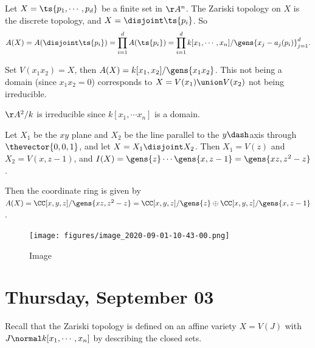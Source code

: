 \begin{example}

Let \(X = \ts{p_1, \cdots, p_d}\) be a finite set in \(\AA^n\). The
Zariski topology on \(X\) is the discrete topology, and
\(X = \disjoint \ts{p_i}\). So
\begin{align*}  
A(X) = A(\disjoint \ts{p_i}) = \prod_{i=1}^d A({\ts{p_i}}) = \prod_{i=1}^d k[x_1, \cdots, x_n] / \gens{x_j - a_j(p_i)}_{j=1}^d
.\end{align*}

\end{example}

\begin{example}

Set \(V(x_1 x_2) = X\), then \(A(X) = k[x_1, x_2]/ \gens{x_1 x_2}\).
This not being a domain (since \(x_1 x_2 = 0\)) corresponds to
\(X = V(x_1) \union V(x_2)\) not being irreducible.

\end{example}

\begin{example}

\(\AA^2/k\) is irreducible since \(k[x_1, \cdots x_n]\) is a domain.

\end{example}

\begin{example}

Let \(X_1\) be the \(xy\) plane and \(X_2\) be the line parallel to the
\(y\dash\)axis through \(\thevector{0,0,1}\), and let
\(X= X_1 \disjoint X_2\). Then \(X_1 = V(z)\) and \(X_2 = V(x, z-1)\),
and \(I(X) = \gens{z} \cdots \gens{x, z-1}= \gens{xz, z^2 - z}\).

Then the coordinate ring is given by
\(A(X) = \CC[x, y, z] / \gens{xz, z^2 - z} = \CC[x, y, z] / \gens{z} \oplus \CC[x, y,z] / \gens{x, z-1}\).

\begin{figure}
\centering
\texttt{[image: figures/image\_2020-09-01-10-43-00.png]}
\caption{Image}
\end{figure}

\end{example}

\hypertarget{thursday-september-03}{%
\section{Thursday, September 03}\label{thursday-september-03}}

Recall that the Zariski topology is defined on an affine variety
\(X = V(J)\) with \(J \normal k[x_1, \cdots, x_n]\) by describing the
closed sets.

